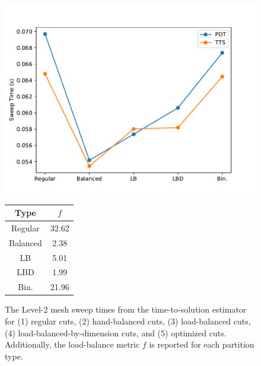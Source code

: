 \begin{figure}[h]
\begin{minipage}[c]{0.65\textwidth}
\centering
\includegraphics[scale=0.65]{../../figures/level2_sweep_comp.pdf}
\end{minipage}
\begin{minipage}[c]{0.33\textwidth}
\begin{table}[H]
\centering
\begin{tabular}{c|c}
\textbf{Type} & \bf $f$ \\ \hline
Regular &  32.62 \\ \hline
Balanced & 2.38 \\ \hline
LB & 5.01 \\ \hline
LBD &  1.99\\ \hline
Bin. &  21.96 \\ \hline
\end{tabular}
\end{table}
\end{minipage}
\caption{The Level-2 mesh sweep times from the time-to-solution estimator for (1) regular cuts, (2) hand-balanced cuts, (3) load-balanced cuts, (4) load-balanced-by-dimension cuts, and (5) optimized cuts. Additionally, the load-balance metric $f$ is reported for each partition type. }
\label{ubp_comp3}
\end{figure}